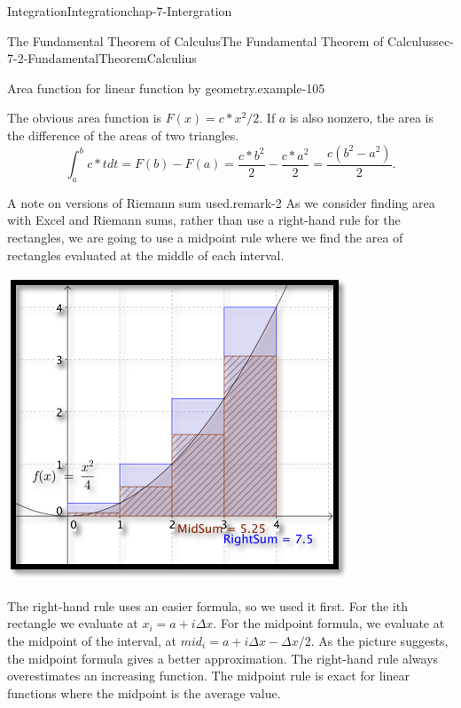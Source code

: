 \documentclass[oneside,10pt,]{book}
\numberwithin{equation}{section}
\begin{document}
\begin{chapterptx}{Integration}{}{Integration}{}{}{chap-7-Intergration}
\begin{sectionptx}{The Fundamental Theorem of Calculus}{}{The Fundamental Theorem of Calculus}{}{}{sec-7-2-FundamentalTheoremCalculius}
\begin{example}{Area function for linear function by geometry.}{example-105}
\begin{sidebyside}{1}{0.2}{0.2}{0}
\begin{sbspanel}{0.6}
\end{sbspanel}%
\end{sidebyside}%
\par
\hypertarget{p-2627}{}%
The obvious area function is \(F(x)=c*x^2/2\).  If \(a\) is also nonzero, the area is the difference of the areas of two triangles.%
%
\begin{equation*}
\int_a^b c*t dt=F(b)-F(a)=
\frac{c*b^2}{2}-\frac{c*a^2}{2}=\frac{c (b^2-a^2 )}{2}.
\end{equation*}
\end{example}
\begin{remark}{A note on versions of Riemann sum used.}{remark-2}%
\hypertarget{p-2628}{}%
As we consider finding area with Excel and Riemann sums, rather than use a right-hand rule for the rectangles, we are going to use a midpoint rule where we find the area of rectangles evaluated at the middle of each interval.%
\begin{sidebyside}{1}{0.2}{0.2}{0}%
\begin{sbspanel}{0.6}%
\includegraphics[width=1\linewidth]{images/sec7-2-3.png}
\end{sbspanel}%
\end{sidebyside}%
\par
\hypertarget{p-2629}{}%
The right-hand rule uses an easier formula, so we used it first.  For the ith rectangle we evaluate at \(x_i=a+i\Delta x\).  For the midpoint formula, we evaluate at the midpoint of the interval, at \(mid_i=a+i\Delta x-\Delta x/2\).  As the picture suggests, the midpoint formula gives a better approximation.  The right-hand rule always overestimates an increasing function.  The midpoint rule is exact for linear functions where the midpoint is the average value.%

\end{remark}
\end{sectionptx}
\end{chapterptx}
\end{document}
